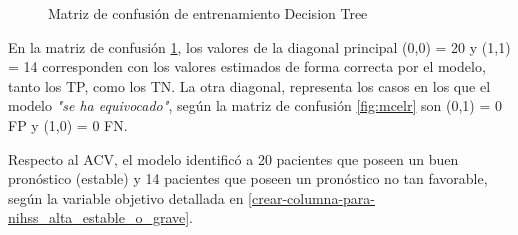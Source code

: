 \begin{center}
    	\begin{figure}[H]
	\centering
	\caption{Matriz de confusión de entrenamiento Decision Tree}
	\label{fig:mcedt}
	\end{figure}
\end{center}
    
	En la matriz de confusión \ref{fig:mcedt}, los valores de la diagonal principal (0,0) = 20 y (1,1) = 14 corresponden con los valores estimados de forma correcta por el modelo, tanto los TP, como los TN. La otra diagonal, representa los casos en los que el modelo \textit{"se ha equivocado"}, según la matriz de confusión \ref{fig:mcelr} son (0,1) = 0 FP y (1,0) = 0 FN.
\par Respecto al ACV, el modelo identificó a 20 pacientes que poseen un buen pronóstico (estable) y 14 pacientes que poseen un pronóstico no tan favorable, según la variable objetivo detallada en \ref{crear-columna-para-nihss_alta_estable_o_grave}.\\